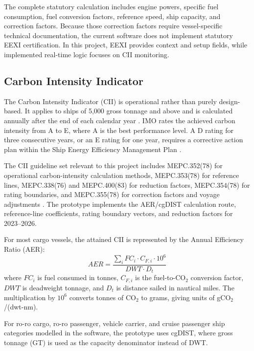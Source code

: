 The complete statutory calculation includes engine powers, specific fuel consumption, fuel conversion factors, reference speed, ship capacity, and correction factors. Because those correction factors require vessel-specific technical documentation, the current software does not implement statutory EEXI certification. In this project, EEXI provides context and setup fields, while implemented real-time logic focuses on CII monitoring.

\subsection{Carbon Intensity Indicator}
The Carbon Intensity Indicator (CII) is operational rather than purely design-based. It applies to ships of 5,000 gross tonnage and above and is calculated annually after the end of each calendar year \cite{imoEexiCiiFaq2026}. IMO rates the achieved carbon intensity from A to E, where A is the best performance level. A D rating for three consecutive years, or an E rating for one year, requires a corrective action plan within the Ship Energy Efficiency Management Plan \cite{imoEexiCiiFaq2026}.

The CII guideline set relevant to this project includes MEPC.352(78) for operational carbon-intensity calculation methods, MEPC.353(78) for reference lines, MEPC.338(76) and MEPC.400(83) for reduction factors, MEPC.354(78) for rating boundaries, and MEPC.355(78) for correction factors and voyage adjustments \cite{imoEexiCiiFaq2026}. The prototype implements the AER/cgDIST calculation route, reference-line coefficients, rating boundary vectors, and reduction factors for 2023--2026.

For most cargo vessels, the attained CII is represented by the Annual Efficiency Ratio (AER):
\begin{equation}
    AER = \frac{\sum_i FC_i \cdot C_{F,i} \cdot 10^6}{DWT \cdot D_t}
    \label{eq:aer-def}
\end{equation}
where $FC_i$ is fuel consumed in tonnes, $C_{F,i}$ is the fuel-to-CO$_2$ conversion factor, $DWT$ is deadweight tonnage, and $D_t$ is distance sailed in nautical miles. The multiplication by $10^6$ converts tonnes of CO$_2$ to grams, giving units of gCO$_2$/(dwt-nm).

For ro-ro cargo, ro-ro passenger, vehicle carrier, and cruise passenger ship categories modelled in the software, the prototype uses cgDIST, where gross tonnage (GT) is used as the capacity denominator instead of DWT.

